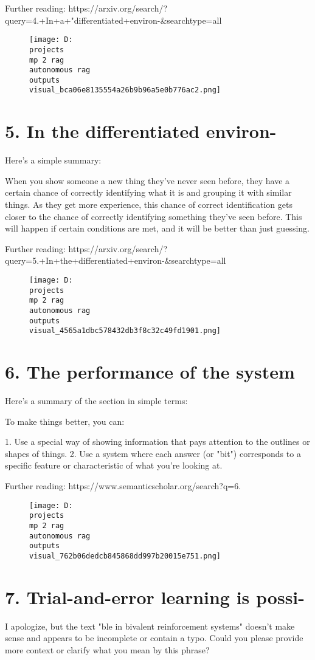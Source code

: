 \documentclass[12pt,a4paper]{article}
\begin{document}
Further reading: https://arxiv.org/search/?query=4.+In+a+"differentiated+environ-&searchtype=all
\begin{figure}[h]
\centering
\texttt{[image: D:\\projects\\mp 2 rag\\autonomous rag\\outputs\\visual\_bca06e8135554a26b9b96a5e0b776ac2.png]}
\end{figure}
\section{5. In the differentiated environ-}
Here's a simple summary:

When you show someone a new thing they've never seen before, they have a certain chance of correctly identifying what it is and grouping it with similar things. As they get more experience, this chance of correct identification gets closer to the chance of correctly identifying something they've seen before. This will happen if certain conditions are met, and it will be better than just guessing.

Further reading: https://arxiv.org/search/?query=5.+In+the+differentiated+environ-&searchtype=all
\begin{figure}[h]
\centering
\texttt{[image: D:\\projects\\mp 2 rag\\autonomous rag\\outputs\\visual\_4565a1dbc578432db3f8c32c49fd1901.png]}
\end{figure}
\section{6. The performance of the system}
Here's a summary of the section in simple terms:

To make things better, you can:

1. Use a special way of showing information that pays attention to the outlines or shapes of things.
2. Use a system where each answer (or "bit") corresponds to a specific feature or characteristic of what you're looking at.

Further reading: https://www.semanticscholar.org/search?q=6.%
\begin{figure}[h]
\centering
\texttt{[image: D:\\projects\\mp 2 rag\\autonomous rag\\outputs\\visual\_762b06dedcb845868dd997b20015e751.png]}
\end{figure}
\section{7. Trial-and-error learning is possi-}
I apologize, but the text "ble in bivalent reinforcement systems" doesn't make sense and appears to be incomplete or contain a typo. Could you please provide more context or clarify what you mean by this phrase?
\end{document}
